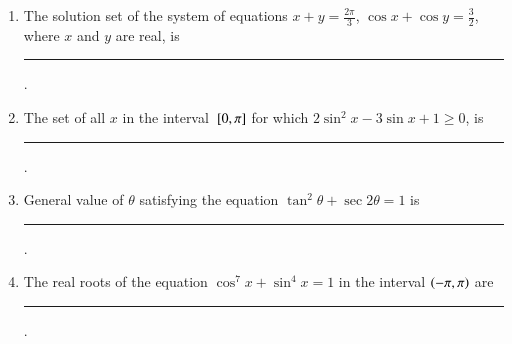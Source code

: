 \begin{enumerate}[label=\thesubsection.\arabic*,ref=\thesubsection.\theenumi]
%
    \item The solution set of the system of equations $x + y = \frac{2\pi}{3}$, $\cos x + \cos y = \frac{3}{2}$, where $x$ and $y$ are real, is \rule{1cm}{0.1pt}. 
        \hfill{}
    \item The set of all $x$ in the interval ${}\left[0,\pi\right]$ for which $2 \sin^2 x -3\sin x +1 \ge 0$,  is \rule{1cm}{0.1pt}. 

        \hfill{}
%
    \item General value of $\theta$ satisfying the equation $\tan^{2}\theta +\sec2\theta = 1$  is \rule{1cm}{0.1pt}. 
        \hfill{}
%
    \item The real roots of the equation $\cos^{7}x + \sin^{4}x = 1$ in the interval $\left(-\pi,\pi\right)$  are 
\rule{1cm}{0.1pt}. 


\end{enumerate}
